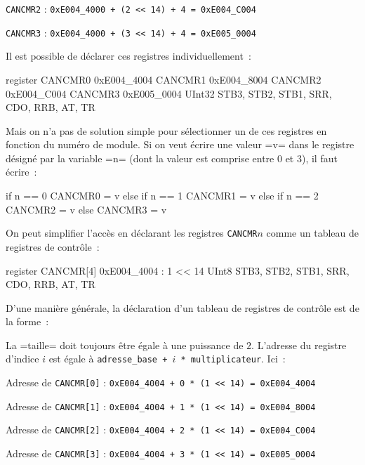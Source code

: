 \texttt{CANCMR2} : \texttt{0xE004\_4000 + (2 << 14) + 4 = 0xE004\_C004}

\texttt{CANCMR3} : \texttt{0xE004\_4000 + (3 << 14) + 4 = 0xE005\_0004}

Il est possible de déclarer ces registres individuellement~:

\begin{OMNIBUS}
register
  CANCMR0 0xE004_4004
  CANCMR1 0xE004_8004
  CANCMR2 0xE004_C004
  CANCMR3 0xE005_0004
UInt32 {
  STB3, STB2, STB1, SRR, CDO, RRB, AT, TR
}
\end{OMNIBUS}

Mais on n'a pas de solution simple pour sélectionner un de ces registres en fonction du numéro de module. Si on veut écrire une valeur \omnibus=v= dans le registre désigné par la variable \omnibus=n= (dont la valeur est comprise entre $0$ et $3$), il faut écrire~:

\begin{OMNIBUS}
if n == 0 {
  CANCMR0 = v
}else if n == 1 {
  CANCMR1 = v
}else if n == 2 {
  CANCMR2 = v
}else{
  CANCMR3 = v
}
\end{OMNIBUS}

On peut simplifier l'accès en déclarant les registres \texttt{CANCMR$n$} comme un tableau de registres de contrôle~:

\begin{OMNIBUS}
register
  CANCMR[4] 0xE004_4004 : 1 << 14
UInt8 {
  STB3, STB2, STB1, SRR, CDO, RRB, AT, TR
}
\end{OMNIBUS}

D'une manière générale, la déclaration d'un tableau de registres de contrôle est de la forme~:

La \omnibus=taille= doit toujours être égale à une puissance de $2$. L'adresse du registre d'indice $i$ est égale à \texttt{adresse\_base + $i$ * multiplicateur}. Ici~:

Adresse de \texttt{CANCMR[0]} : \texttt{0xE004\_4004 + 0 * (1 << 14) = 0xE004\_4004}

Adresse de \texttt{CANCMR[1]} : \texttt{0xE004\_4004 + 1 * (1 << 14) = 0xE004\_8004}

Adresse de \texttt{CANCMR[2]} : \texttt{0xE004\_4004 + 2 * (1 << 14) = 0xE004\_C004}

Adresse de \texttt{CANCMR[3]} : \texttt{0xE004\_4004 + 3 * (1 << 14) = 0xE005\_0004}

